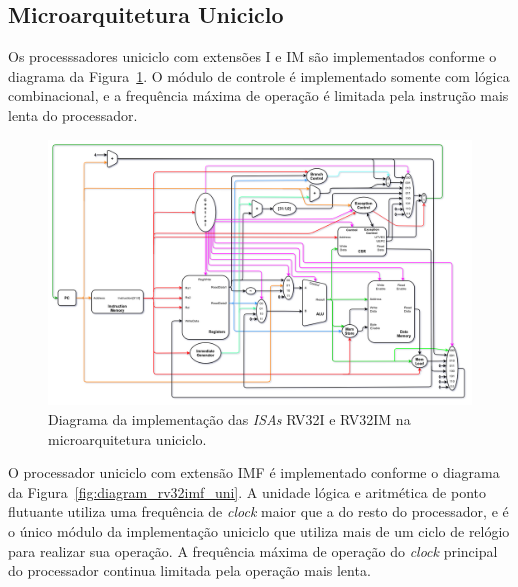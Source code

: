     \subsection{Microarquitetura Uniciclo}

        { Os processsadores uniciclo com extensões I e IM são implementados
            conforme o diagrama da Figura~\ref{fig:diagram_rv32i_uni}. O módulo
            de controle é implementado somente com lógica combinacional, e a
            frequência máxima de operação é limitada pela instrução mais lenta
            do processador.
        }

        \begin{figure}[H]
        \centering
            \includegraphics[width=1\linewidth]{../images/uarch_diagrams/singlecycle-RV32I-RV32IM.png}
            \caption{Diagrama da implementação das \textit{ISAs} RV32I e RV32IM na
            microarquitetura uniciclo.}\label{fig:diagram_rv32i_uni}
        \end{figure}

        { O processador uniciclo com extensão IMF é implementado conforme o
            diagrama da Figura~\ref{fig:diagram_rv32imf_uni}. A unidade lógica e
            aritmética de ponto flutuante utiliza uma frequência de \textit{clock}
            maior que a do resto do processador, e é o único módulo da implementação
            uniciclo que utiliza mais de um ciclo de relógio para realizar sua
            operação. A frequência máxima de operação do \textit{clock} principal
            do processador continua limitada pela operação mais lenta.
        }

